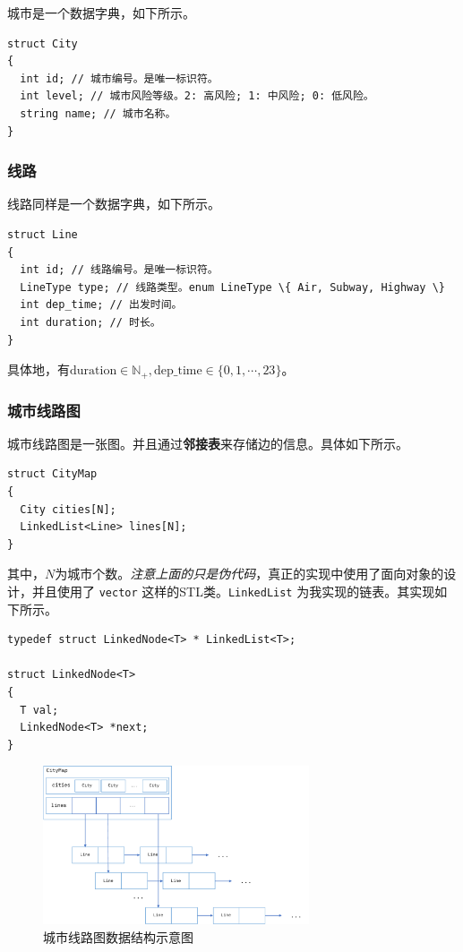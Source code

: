 城市是一个数据字典，如下所示。

\begin{lstlisting}[caption={城市数据结构}]
struct City
{
  int id; // 城市编号。是唯一标识符。
  int level; // 城市风险等级。2: 高风险; 1: 中风险; 0: 低风险。
  string name; // 城市名称。
}
\end{lstlisting}

\subsubsection{线路}

线路同样是一个数据字典，如下所示。

\begin{lstlisting}[caption={线路数据结构}]
struct Line
{
  int id; // 线路编号。是唯一标识符。
  LineType type; // 线路类型。enum LineType \{ Air, Subway, Highway \}
  int dep_time; // 出发时间。
  int duration; // 时长。
}
\end{lstlisting}

具体地，有$\text{duration} \in \mathds N_+, \text{dep\_time} \in \{ 0, 1, \cdots, 23 \}$。

\subsubsection{城市线路图}

城市线路图是一张图。并且通过\textbf{邻接表}来存储边的信息。具体如下所示。

\begin{lstlisting}[caption={线路数据结构}]
struct CityMap
{
  City cities[N];
  LinkedList<Line> lines[N];
}
\end{lstlisting}

其中，$N$为城市个数。\textit{注意上面的只是伪代码}，真正的实现中使用了面向对象的设计，并且使用了 \lstinline{vector} 这样的STL类。\lstinline{LinkedList} 为我实现的链表。其实现如下所示。

\begin{lstlisting}[caption={链表数据结构}]
typedef struct LinkedNode<T> * LinkedList<T>;

struct LinkedNode<T>
{
  T val;
  LinkedNode<T> *next;
}
\end{lstlisting}

\begin{figure}[h]
  \centering
  \includegraphics[width=0.7\textwidth]{figures/city_map_structure}
  \caption{城市线路图数据结构示意图}
  \label{fig:city-map-structure}
\end{figure}

